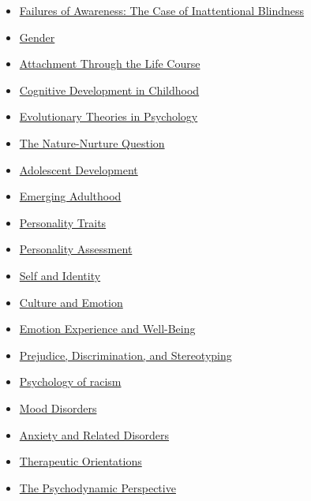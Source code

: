 \documentclass[
]{article}
\begin{document}
\begin{itemize}
\item
  \href{http://nobaproject.com/modules/failures-of-awareness-the-case-of-inattentional-blindness}{Failures of Awareness: The Case of Inattentional Blindness}
\item
  \href{http://nobaproject.com/modules/gender}{Gender}
\item
  \href{http://nobaproject.com/modules/attachment-through-the-life-course}{Attachment Through the Life Course}
\item
  \href{http://nobaproject.com/modules/cognitive-development-in-childhood}{Cognitive Development in Childhood}
\item
  \href{http://nobaproject.com/modules/evolutionary-theories-in-psychology}{Evolutionary Theories in Psychology}
\item
  \href{http://nobaproject.com/modules/the-nature-nurture-question}{The Nature-Nurture Question}
\item
  \href{http://nobaproject.com/modules/adolescent-development}{Adolescent Development}
\item
  \href{http://nobaproject.com/modules/emerging-adulthood}{Emerging Adulthood}
\item
  \href{http://nobaproject.com/modules/personality-traits}{Personality Traits}
\item
  \href{http://nobaproject.com/modules/personality-assessment}{Personality Assessment}
\item
  \href{http://nobaproject.com/modules/self-and-identity}{Self and Identity}
\item
  \href{http://nobaproject.com/modules/culture-and-emotion}{Culture and Emotion}
\item
  \href{http://nobaproject.com/modules/emotion-experience-and-well-being}{Emotion Experience and Well-Being}
\item
  \href{http://nobaproject.com/modules/prejudice-discrimination-and-stereotyping}{Prejudice, Discrimination, and Stereotyping}
\item
  \href{https://nobaproject.com/modules/psychology-of-racism}{Psychology of racism}
\item
  \href{http://nobaproject.com/modules/mood-disorders}{Mood Disorders}
\item
  \href{http://nobaproject.com/modules/anxiety-and-related-disorders}{Anxiety and Related Disorders}
\item
  \href{http://nobaproject.com/modules/therapeutic-orientations}{Therapeutic Orientations}
\item
  \href{http://nobaproject.com/modules/the-psychodynamic-perspective}{The Psychodynamic Perspective}

\end{itemize}
\end{document}

